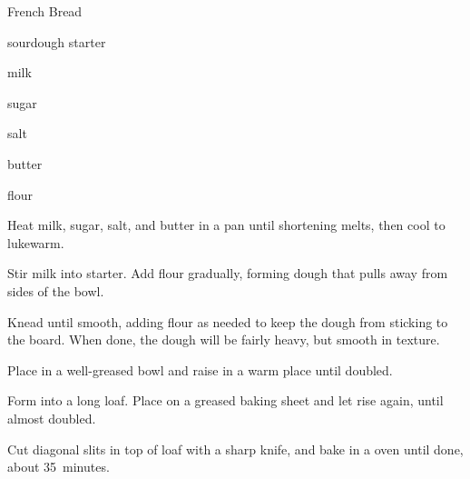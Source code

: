 \begin{recipe}{French Bread}{}{}

\begin{ingredients}
\item {} sourdough starter
\item \C{\half} milk
\item \Tp{1\eighth} sugar
\item \tp{2\quarter} salt
\item \C{\eighth} butter 
\item \C{1\twothird} flour
\end{ingredients}

\begin{directions}

\item Heat milk, sugar, salt, and butter in a pan until shortening melts, then cool to lukewarm.

\item Stir milk into starter. Add flour gradually, forming dough that pulls away from sides of the bowl.

\item Knead until smooth, adding flour as needed to keep the dough from sticking to the board. When done, the dough will be fairly heavy, but smooth in texture.

\item Place in a well-greased bowl and raise in a warm place until doubled.

\item Form into a long loaf. Place on a greased baking sheet and let rise again, until almost doubled.

\item Cut diagonal slits in top of loaf with a sharp knife, and bake in a  oven until done, about 35~minutes.

\end{directions}
\end{recipe}
